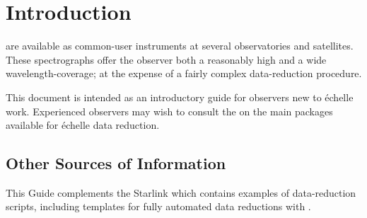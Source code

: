  \newpage
 \begin{latex}
   \setlength{\parskip}{0mm}
   \latexonlytoc
   \setlength{\parskip}{\medskipamount}
 \end{latex}
\newpage
\renewcommand{\thepage}{\arabic{page}}
\setcounter{page}{1}

\section{\label{se_introduction}Introduction}

  are available as
common-user instruments at several observatories and satellites.  These
spectrographs offer the observer both a reasonably high
 and
a wide wavelength-coverage; at the expense of a fairly complex
data-reduction procedure.

This document is intended as an introductory guide for observers
new to \'{e}chelle work.  Experienced observers may wish to consult
{the }
on the main packages available for \'{e}chelle data reduction.


\subsection{\label{se_other_sources}Other
            Sources of Information}

This Guide complements the Starlink  which contains examples of
data-reduction scripts, including templates for fully automated data
reductions with \@.

